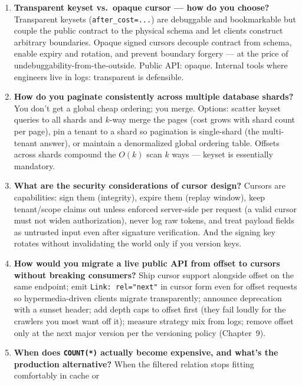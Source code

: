 \begin{enumerate}[label=\textbf{Q\arabic*.}, leftmargin=2.6em]
        index.
  \item \textbf{Transparent keyset vs.\ opaque cursor --- how do you
        choose?}
        Transparent keysets (\texttt{after\_cost=...}) are debuggable and
        bookmarkable but couple the public contract to the physical schema
        and let clients construct arbitrary boundaries. Opaque signed
        cursors decouple contract from schema, enable expiry and rotation,
        and prevent boundary forgery --- at the price of
        undebuggability-from-the-outside. Public API: opaque. Internal
        tools where engineers live in logs: transparent is defensible.
  \item \textbf{How do you paginate consistently across multiple database
        shards?}
        You don't get a global cheap ordering; you merge. Options: scatter
        keyset queries to all shards and $k$-way merge the pages (cost
        grows with shard count per page), pin a tenant to a shard so
        pagination is single-shard (the multi-tenant answer), or maintain a
        denormalized global ordering table. Offsets across shards compound
        the $O(k)$ scan $k$ ways --- keyset is essentially mandatory.
  \item \textbf{What are the security considerations of cursor design?}
        Cursors are capabilities: sign them (integrity), expire them
        (replay window), keep tenant/scope claims out unless enforced
        server-side per request (a valid cursor must not widen
        authorization), never log raw tokens, and treat payload fields as
        untrusted input even after signature verification. And the signing
        key rotates without invalidating the world only if you version keys.
  \item \textbf{How would you migrate a live public API from offset to
        cursors without breaking consumers?}
        Ship cursor support alongside offset on the same endpoint; emit
        \texttt{Link: rel="next"} in cursor form even for offset requests
        so hypermedia-driven clients migrate transparently; announce
        deprecation with a sunset header; add depth caps to offset first
        (they fail loudly for the crawlers you most want off it); measure
        strategy mix from logs; remove offset only at the next major
        version per the versioning policy (Chapter~9).
  \item \textbf{When does \texttt{COUNT(*)} actually become expensive, and
        what's the production alternative?}
        When the filtered relation stops fitting comfortably in cache or

\end{enumerate}
